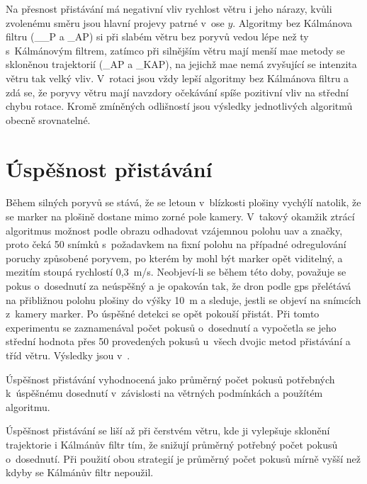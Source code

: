     Na přesnost přistávání má negativní vliv rychlost větru i jeho nárazy, kvůli zvolenému směru jsou hlavní projevy patrné v~ose $y$. Algoritmy bez Kálmánova filtru (\_\_P a \_AP) si při slabém větru bez poryvů vedou lépe než ty s~Kálmánovým filtrem, zatímco při silnějším větru mají menší \acrshort{mae} metody se skloněnou trajektorií (\_AP a \_KAP), na jejichž \acrshort{mae} nemá zvyšující se intenzita větru tak velký vliv. V~rotaci jsou vždy lepší algoritmy bez Kálmánova filtru a zdá se, že poryvy větru mají navzdory očekávání spíše pozitivní vliv na střední chybu rotace. Kromě zmíněných odlišností jsou výsledky jednotlivých algoritmů obecně srovnatelné.
  \section{Úspěšnost přistávání} \label{sec:uspesnost}
    Během silných poryvů se stává, že se letoun v~blízkosti plošiny vychýlí natolik, že se marker na plošině dostane mimo zorné pole kamery. V~takový okamžik ztrácí algoritmus možnost podle obrazu odhadovat vzájemnou polohu \acrshort{uav} a značky, proto čeká 50 snímků s~požadavkem na fixní polohu na případné odregulování poruchy způsobené poryvem, po kterém by mohl být marker opět viditelný, a mezitím stoupá rychlostí 0{,}3~m/s. {Neobjeví-li} se během této doby, považuje se pokus o~dosednutí za neúspěšný a je opakován tak, že dron podle \acrshort{gps} přelétává na přibližnou polohu plošiny do výšky 10~m a sleduje, jestli se objeví na snímcích z~kamery marker. Po úspěšné detekci se opět pokouší přistát. Při tomto experimentu se zaznamenával počet pokusů o~dosednutí a vypočetla se jeho střední hodnota přes 50 provedených pokusů u~všech dvojic metod přistávání a tříd větru. Výsledky jsou v~.

    \begin{table}[H]
      \centering
      
      \caption[Úspěšnost přistávání]{Úspěšnost přistávání vyhodnocená jako průměrný počet pokusů potřebných k~úspěšnému dosednutí v~závislosti na větrných podmínkách a použítém algoritmu.}
      \label{tab:uspesnost}
    \end{table}

    Úspěšnost přistávání se liší až při čerstvém větru, kde ji vylepšuje sklonění trajektorie i Kálmánův filtr tím, že snižují průměrný potřebný počet pokusů o~dosednutí. Při použití obou strategií je průměrný počet pokusů mírně vyšší než kdyby se Kálmánův filtr nepoužil.

